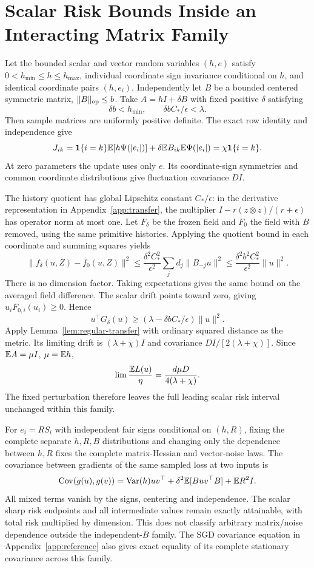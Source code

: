 \section{Scalar Risk Bounds Inside an Interacting Matrix Family}
\label{app:robust}

Let the bounded scalar and vector random variables $(h,e)$ satisfy
$0<h_{\min}\leq h\leq h_{\max}$, individual coordinate sign invariance
conditional on $h$, and identical coordinate pairs $(h,e_i)$. Independently
let $B$ be a bounded centered symmetric matrix, $\|B\|_{\rm op}\leq b$.
Take $A=hI+\delta B$ with fixed positive $\delta$ satisfying
\[
 \delta b<h_{\min},\qquad \delta bC_*/\epsilon<\lambda.
\]
Then sample matrices are uniformly positive definite. The exact row identity
and independence give
\[
 J_{ik}=\mathbf1\{i=k\}\mathbb E[h\Psi(|e_i|)]
              +\delta\mathbb E B_{ik}\mathbb E\Psi(|e_i|)
       =\chi\mathbf1\{i=k\}.
\]
At zero parameters the update uses only $e$. Its coordinate-sign
symmetries and common coordinate distributions give fluctuation
covariance $DI$.

The history quotient has global Lipschitz constant $C_*/\epsilon$:
in the derivative representation in Appendix~\ref{app:transfer}, the
multiplier $I-r(z\otimes z)/(r+\epsilon)$ has operator norm at most one.
Let $F_\delta$ be the frozen field and $F_0$ the field with $B$ removed,
using the same primitive histories. Applying the quotient bound in each
coordinate and summing squares yields
\[
 \|f_\delta(u,Z)-f_0(u,Z)\|^2
 \leq\frac{\delta^2C_*^2}{\epsilon^2}
                 \sum_jd_j\|B_{-j}u\|^2
 \leq\frac{\delta^2b^2C_*^2}{\epsilon^2}\|u\|^2.
\]
There is no dimension factor. Taking expectations gives the same bound
on the averaged field difference. The scalar drift points toward zero, giving $u_iF_{0,i}(u_i)\geq0$. Hence
\[
 u^\top G_\delta(u)\geq
        (\lambda-\delta bC_*/\epsilon)\|u\|^2.
\]
Apply Lemma~\ref{lem:regular-transfer} with ordinary squared distance as the metric. Its
limiting drift is $(\lambda+\chi)I$ and covariance
$D I/[2(\lambda+\chi)]$. Since $\mathbb E A=\mu I$, $\mu=\mathbb E h$,
\[
 \lim\frac{\mathbb E L(u)}\eta=\frac{d\mu D}{4(\lambda+\chi)}.
\]
The fixed perturbation therefore leaves the full leading scalar risk
interval unchanged within this family.

For $e_i=RS_i$ with independent fair signs conditional on $(h,R)$, fixing
the complete separate $h,R,B$ distributions and changing only the
dependence between $h,R$ fixes
the complete matrix-Hessian and vector-noise laws. The covariance between gradients of the same sampled loss at two inputs is
\[
 \operatorname{Cov}(g(u),g(v))=\operatorname{Var}(h)uv^\top
        +\delta^2\mathbb E[Buv^\top B]+\mathbb E R^2I.
\]
All mixed terms vanish by the signs, centering and independence. The scalar
sharp risk endpoints and all intermediate values remain exactly attainable,
with total risk multiplied by dimension. This does not classify arbitrary
matrix/noise dependence outside the independent-$B$ family. The SGD
covariance equation in Appendix~\ref{app:reference} also gives exact
equality of its complete stationary covariance across this family.

